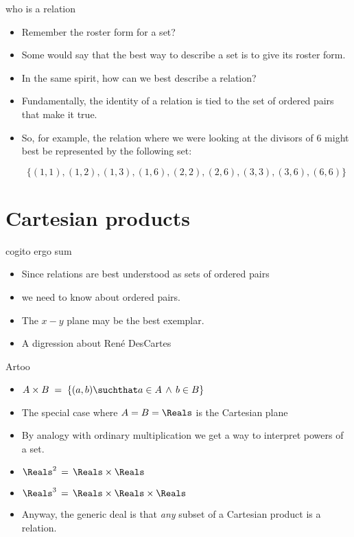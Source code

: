 \documentclass[handout,landscape]{beamer}
\begin{document}
\begin{frame}{who is a relation}
\begin{itemize}
\item Remember the roster form for a set? \pause
\item Some would say that the best way to describe a set is to give its roster form. \pause
\item In the same spirit, how can we best describe a relation? \pause
\item Fundamentally, the identity of a relation is tied to the set of ordered pairs that make it true.\pause
\item So, for example, the relation where we were looking at the divisors of 6 might best be represented by the following set: \pause

\[ \{ (1,1), (1,2), (1,3), (1,6), (2,2), (2,6), (3,3), (3,6), (6,6) \} \]

\end{itemize}
\end{frame}

\section{Cartesian products}

\begin{frame}{cogito ergo sum}
\begin{itemize}
\item Since relations are best understood as sets of ordered pairs \pause
\item we need to know about ordered pairs. \pause
\item The $x-y$ plane may be the best exemplar. \pause
\item A digression about Ren\'{e} DesCartes\textellipsis
\end{itemize}
\end{frame}

\begin{frame}{Artoo}
\begin{itemize}
\item $\displaystyle A \times B \; = \; \{ (a,b) \suchthat a \in A \, \land \, b \in B \} $ \pause
\item The special case where $A = B = \Reals$ is the Cartesian plane
\item By analogy with ordinary multiplication we get a way to interpret powers of a set. \pause
\item $\displaystyle \Reals^2 \, = \, \Reals \times \Reals$ \pause
\item $\displaystyle \Reals^3 \, = \, \Reals \times \Reals \times \Reals$ \pause
\item Anyway, the generic deal is that {\em any} subset of a Cartesian product is a relation.
\end{itemize}
\end{frame}
\end{document}
